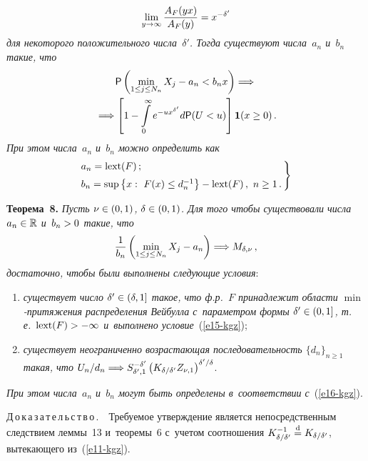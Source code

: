 \begin{multicols}{2}
\noindent
\begin{equation}
\lim_{y\to\-\infty}\displaystyle\frac{\displaystyle A_F(yx)\mathstrut}{\displaystyle A_F(y)\mathstrut}=x^{-\delta'}\label{e15-kgz}
\end{equation}
\textit{для некоторого положительного числа~$\delta'$. Тогда существуют
числа~$a_n$ и~$b_n$ такие, что}
\begin{multline*}
{\sf P}\left(\min_{1\le j\le N_n}X_j-a_n<b_nx\right) \Longrightarrow{}\\
{} \Longrightarrow
\left[1-\int\limits_{0}^{\infty}e^{-u x^{\delta'}}d{\sf P}
(U<u)\right]\mathbf{1}(x\ge 0)\,.
\end{multline*}
\textit{При этом числа~$a_n$ и~$b_n$ можно определить как}
\begin{equation}
\left.
\begin{array}{l}
\hspace*{-2mm}a_n={\mathrm{lext}}(F)\,;\\[6pt]
  \hspace*{-2mm}b_n=\sup\left\{x:\ F(x)\le
d_n^{-1}\right\}-{\mathrm{lext}}(F)\,,\  n\ge1\,.
\end{array}\!\!
\right\}
\label{e16-kgz}
\end{equation}

\smallskip

\noindent
\textbf{Теорема~8.} \textit{Пусть $\nu\hm\in(0,1)$, $\delta\hm\in(0,1)$. Для
того чтобы существовали числа $a_n\hm\in\mathbb{R}$ и~$b_n\hm>0$ такие, что}
$$
\displaystyle\frac{\displaystyle 1\mathstrut}{\displaystyle b_n\mathstrut}\left(\min\limits_{1\le j\le N_n}X_j-a_n\right)\Longrightarrow
M_{\delta,\nu}\,,
$$
\textit{достаточно, чтобы были выполнены следующие условия}:
\begin{enumerate}[(1)]
\item \textit{существует число $\delta'\hm\in(\delta,1]$ такое, что
ф.р.~$F$ принадлежит области $\min$-при\-тя\-же\-ния распределения
Вейбулла с~параметром формы $\delta'\hm\in(0,1]$, т.\,е.\ $\mathrm{lext}(F)
\hm>-\infty$ и~выполнено условие}~(\ref{e15-kgz});

\item \textit{существует неограниченно возрастающая
последовательность $\{d_n\}_{n\ge1}$ такая, что}
$U_n/d_n\hm\Longrightarrow S_{\delta',1}^{-\delta'}
\left(K_{\delta/\delta'}Z_{\nu,1}\right)^{\delta'/\delta}$.
\end{enumerate}

\textit{При этом числа~$a_n$ и~$b_n$ могут быть определены 
в~соответствии с}~(\ref{e16-kgz}).

\smallskip

\noindent
Д\,о\,к\,а\,з\,а\,т\,е\,л\,ь\,с\,т\,в\,о\,.\ \ Требуемое утверждение является
непосредственным следствием леммы~13 и~тео\-ре\-мы~6 с~учетом
соотношения $K_{\delta/\delta'}^{-1}\hm\eqd K_{\delta/\delta'}$,
вытекающего из~(\ref{e11-kgz}).


\end{multicols}
